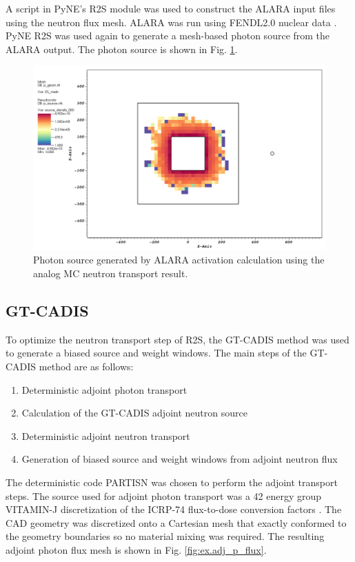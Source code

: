 A script in PyNE's R2S module was used
to construct the ALARA input files using the neutron flux mesh.
ALARA was run using FENDL2.0 nuclear data \cite{fendl2}. PyNE R2S
was used again to generate a mesh-based photon source from the ALARA output.  
The photon source is shown in Fig. \ref{fig:ex.analog_psrc}.
\begin{figure} 
	\includegraphics[scale=0.4]{figs/analog_p_src_g1.png}
	\caption [Analog photon source]
	{Photon source generated by ALARA activation calculation using the
	 analog MC neutron transport result.\label{fig:ex.analog_psrc}}
\end{figure}


\subsection{GT-CADIS}\label{sec:gtcadis}
To optimize the neutron transport step of R2S, the
GT-CADIS method was used to generate a biased source and weight windows.
The main steps of the GT-CADIS method are as follows:
\begin{enumerate}
	\item Deterministic adjoint photon transport
	\item Calculation of the GT-CADIS adjoint neutron source
	\item Deterministic adjoint neutron transport
	\item Generation of biased source and weight windows from adjoint neutron flux
\end{enumerate}

The deterministic code PARTISN \cite{partisn} was chosen to perform the adjoint transport
steps.  The source used for adjoint photon transport was a 42 energy group 
VITAMIN-J discretization of the ICRP-74 flux-to-dose conversion factors \cite{f2d}.  
The CAD geometry was discretized onto
a Cartesian mesh that exactly conformed to the geometry boundaries so no
material mixing was required.  The resulting adjoint photon flux mesh is shown in
Fig. \ref{fig:ex.adj_p_flux}.

